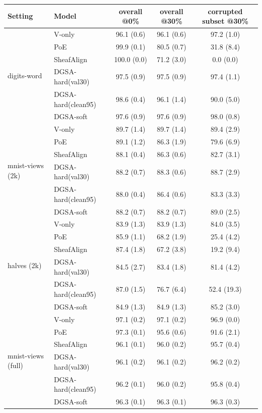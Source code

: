 \small
\begin{tabular}{llccc}
\toprule
Setting & Model & overall @0\% & overall @30\% & corrupted subset @30\% \\
\midrule
\multirow{6}{*}{digits-word} & V-only & 96.1 (0.6) & 96.1 (0.6) & 97.2 (1.0) \\
 & PoE & 99.9 (0.1) & 80.5 (0.7) & 31.8 (8.4) \\
 & SheafAlign & 100.0 (0.0) & 71.2 (3.0) & 0.0 (0.0) \\
 & DGSA-hard(val30) & 97.5 (0.9) & 97.5 (0.9) & 97.4 (1.1) \\
 & DGSA-hard(clean95) & 98.6 (0.4) & 96.1 (1.4) & 90.0 (5.0) \\
 & DGSA-soft & 97.6 (0.9) & 97.6 (0.9) & 98.0 (0.8) \\
\midrule
\multirow{6}{*}{mnist-views (2k)} & V-only & 89.7 (1.4) & 89.7 (1.4) & 89.4 (2.9) \\
 & PoE & 89.1 (1.2) & 86.3 (1.9) & 79.6 (6.9) \\
 & SheafAlign & 88.1 (0.4) & 86.3 (0.6) & 82.7 (3.1) \\
 & DGSA-hard(val30) & 88.2 (0.7) & 88.3 (0.6) & 88.7 (2.9) \\
 & DGSA-hard(clean95) & 88.0 (0.4) & 86.4 (0.6) & 83.3 (3.3) \\
 & DGSA-soft & 88.2 (0.7) & 88.2 (0.7) & 89.0 (2.5) \\
\midrule
\multirow{6}{*}{halves (2k)} & V-only & 83.9 (1.3) & 83.9 (1.3) & 84.0 (3.5) \\
 & PoE & 85.9 (1.1) & 68.2 (1.9) & 25.4 (4.2) \\
 & SheafAlign & 87.4 (1.8) & 67.2 (3.8) & 19.2 (9.4) \\
 & DGSA-hard(val30) & 84.5 (2.7) & 83.4 (1.8) & 81.4 (4.2) \\
 & DGSA-hard(clean95) & 87.0 (1.5) & 76.7 (6.4) & 52.4 (19.3) \\
 & DGSA-soft & 84.9 (1.3) & 84.9 (1.3) & 85.2 (3.0) \\
\midrule
\multirow{6}{*}{mnist-views (full)} & V-only & 97.1 (0.2) & 97.1 (0.2) & 96.9 (0.0) \\
 & PoE & 97.3 (0.1) & 95.6 (0.6) & 91.6 (2.1) \\
 & SheafAlign & 96.1 (0.1) & 96.0 (0.2) & 95.7 (0.4) \\
 & DGSA-hard(val30) & 96.1 (0.2) & 96.1 (0.2) & 96.2 (0.2) \\
 & DGSA-hard(clean95) & 96.2 (0.1) & 96.0 (0.2) & 95.8 (0.4) \\
 & DGSA-soft & 96.3 (0.1) & 96.3 (0.1) & 96.3 (0.3) \\
\bottomrule
\end{tabular}
